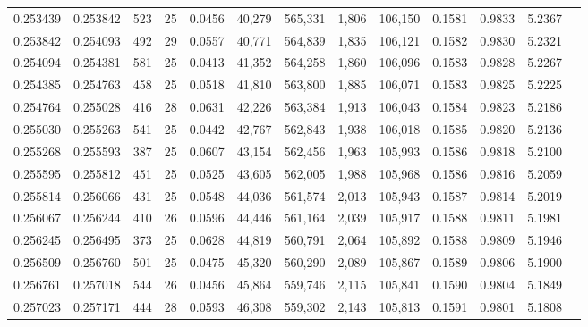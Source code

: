 \begin{tabular}{rrrrrrrrrrrrr}
0.253439 & 0.253842 &   523 &  25 &                                     0.0456 &  40,279 & 565,331 &   1,806 & 106,150 & 0.1581 & 0.9833 & 5.2367 \\
0.253842 & 0.254093 &   492 &  29 &                                     0.0557 &  40,771 & 564,839 &   1,835 & 106,121 & 0.1582 & 0.9830 & 5.2321 \\
0.254094 & 0.254381 &   581 &  25 &                                     0.0413 &  41,352 & 564,258 &   1,860 & 106,096 & 0.1583 & 0.9828 & 5.2267 \\
0.254385 & 0.254763 &   458 &  25 &                                     0.0518 &  41,810 & 563,800 &   1,885 & 106,071 & 0.1583 & 0.9825 & 5.2225 \\
0.254764 & 0.255028 &   416 &  28 &                                     0.0631 &  42,226 & 563,384 &   1,913 & 106,043 & 0.1584 & 0.9823 & 5.2186 \\
0.255030 & 0.255263 &   541 &  25 &                                     0.0442 &  42,767 & 562,843 &   1,938 & 106,018 & 0.1585 & 0.9820 & 5.2136 \\
0.255268 & 0.255593 &   387 &  25 &                                     0.0607 &  43,154 & 562,456 &   1,963 & 105,993 & 0.1586 & 0.9818 & 5.2100 \\
0.255595 & 0.255812 &   451 &  25 &                                     0.0525 &  43,605 & 562,005 &   1,988 & 105,968 & 0.1586 & 0.9816 & 5.2059 \\
0.255814 & 0.256066 &   431 &  25 &                                     0.0548 &  44,036 & 561,574 &   2,013 & 105,943 & 0.1587 & 0.9814 & 5.2019 \\
0.256067 & 0.256244 &   410 &  26 &                                     0.0596 &  44,446 & 561,164 &   2,039 & 105,917 & 0.1588 & 0.9811 & 5.1981 \\
0.256245 & 0.256495 &   373 &  25 &                                     0.0628 &  44,819 & 560,791 &   2,064 & 105,892 & 0.1588 & 0.9809 & 5.1946 \\
0.256509 & 0.256760 &   501 &  25 &                                     0.0475 &  45,320 & 560,290 &   2,089 & 105,867 & 0.1589 & 0.9806 & 5.1900 \\
0.256761 & 0.257018 &   544 &  26 &                                     0.0456 &  45,864 & 559,746 &   2,115 & 105,841 & 0.1590 & 0.9804 & 5.1849 \\
0.257023 & 0.257171 &   444 &  28 &                                     0.0593 &  46,308 & 559,302 &   2,143 & 105,813 & 0.1591 & 0.9801 & 5.1808 \\

\end{tabular}
